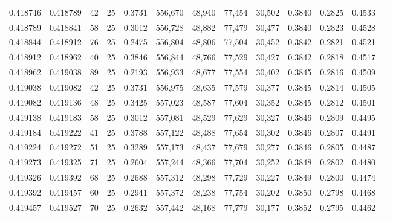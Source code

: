 \begin{tabular}{rrrrrrrrrrrrr}
0.418746 & 0.418789 &    42 &  25 &                                     0.3731 & 556,670 &  48,940 &  77,454 &  30,502 & 0.3840 & 0.2825 & 0.4533 \\
0.418789 & 0.418841 &    58 &  25 &                                     0.3012 & 556,728 &  48,882 &  77,479 &  30,477 & 0.3840 & 0.2823 & 0.4528 \\
0.418844 & 0.418912 &    76 &  25 &                                     0.2475 & 556,804 &  48,806 &  77,504 &  30,452 & 0.3842 & 0.2821 & 0.4521 \\
0.418912 & 0.418962 &    40 &  25 &                                     0.3846 & 556,844 &  48,766 &  77,529 &  30,427 & 0.3842 & 0.2818 & 0.4517 \\
0.418962 & 0.419038 &    89 &  25 &                                     0.2193 & 556,933 &  48,677 &  77,554 &  30,402 & 0.3845 & 0.2816 & 0.4509 \\
0.419038 & 0.419082 &    42 &  25 &                                     0.3731 & 556,975 &  48,635 &  77,579 &  30,377 & 0.3845 & 0.2814 & 0.4505 \\
0.419082 & 0.419136 &    48 &  25 &                                     0.3425 & 557,023 &  48,587 &  77,604 &  30,352 & 0.3845 & 0.2812 & 0.4501 \\
0.419138 & 0.419183 &    58 &  25 &                                     0.3012 & 557,081 &  48,529 &  77,629 &  30,327 & 0.3846 & 0.2809 & 0.4495 \\
0.419184 & 0.419222 &    41 &  25 &                                     0.3788 & 557,122 &  48,488 &  77,654 &  30,302 & 0.3846 & 0.2807 & 0.4491 \\
0.419224 & 0.419272 &    51 &  25 &                                     0.3289 & 557,173 &  48,437 &  77,679 &  30,277 & 0.3846 & 0.2805 & 0.4487 \\
0.419273 & 0.419325 &    71 &  25 &                                     0.2604 & 557,244 &  48,366 &  77,704 &  30,252 & 0.3848 & 0.2802 & 0.4480 \\
0.419326 & 0.419392 &    68 &  25 &                                     0.2688 & 557,312 &  48,298 &  77,729 &  30,227 & 0.3849 & 0.2800 & 0.4474 \\
0.419392 & 0.419457 &    60 &  25 &                                     0.2941 & 557,372 &  48,238 &  77,754 &  30,202 & 0.3850 & 0.2798 & 0.4468 \\
0.419457 & 0.419527 &    70 &  25 &                                     0.2632 & 557,442 &  48,168 &  77,779 &  30,177 & 0.3852 & 0.2795 & 0.4462 \\

\end{tabular}
